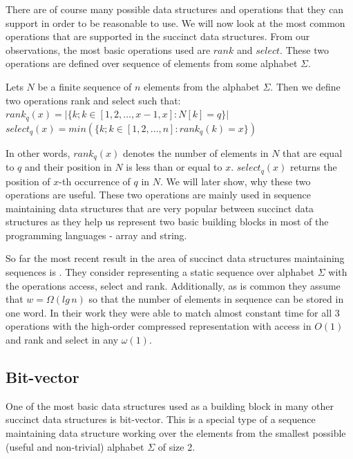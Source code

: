 There are of course many possible data structures and operations that they can support in order to be reasonable to use. We will now look at the most common operations that are supported in the succinct data structures. From our observations, the most basic operations used are $rank$ and $select$. These two operations are defined over sequence of elements from some alphabet $\Sigma$.

\begin{theorem}
Lets $N$ be a finite sequence of $n$ elements from the alphabet $\Sigma$.
Then we define two operations rank and select such that: \\
$rank_q(x) = | \{k; k \in [ 1, 2, \ldots, x-1, x] : N[k] = q  \} |$ \\
$select_q(x) = min (\{k; k \in [ 1, 2, \ldots, n] : rank_q(k)=x  \}) $
\end{theorem}

In other words, $rank_q(x)$ denotes the number of elements in $N$ that are equal to $q$ and their position in $N$ is less than or equal to $x$. $select_q(x)$ returns the position of $x$-th occurrence of $q$ in $N$. We will later show, why these two operations are useful. These two operations are mainly used in sequence maintaining data structures that are very popular between succinct data structures as they help us represent two basic building blocks in most of the programming languages - array and string.

So far the most recent result in the area of succinct data structures maintaining sequences is \cite{belazzougui2015optimal}. They consider representing a static sequence over alphabet $\Sigma$ with the operations access, select and rank. Additionally, as is common they assume that $w=\Omega(lg\,n)$ so that the number of elements in sequence can be stored in one word. In their work they were able to match almost constant time for all 3 operations with the high-order compressed representation with access in $O(1)$ and rank and select in any $\omega(1)$. 

\subsection{Bit-vector}

One of the most basic data structures used as a building block in many other succinct data structures is bit-vector. This is a special type of a sequence maintaining data structure working over the elements from the smallest possible (useful and non-trivial) alphabet $\Sigma$ of size 2.

